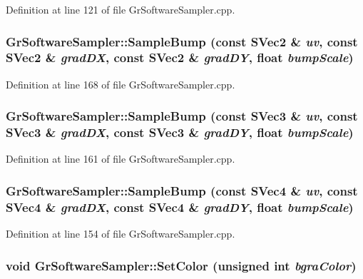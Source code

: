 Definition at line 121 of file GrSoftwareSampler.cpp.\hypertarget{class_gr_software_sampler_12d44d76b68457f8edf5d1f083c56b95}{
\subsubsection[{SampleBump}]{ GrSoftwareSampler::SampleBump (const {\bf SVec2} \& {\em uv}, \/  const {\bf SVec2} \& {\em gradDX}, \/  const {\bf SVec2} \& {\em gradDY}, \/  float {\em bumpScale})}}
\label{class_gr_software_sampler_12d44d76b68457f8edf5d1f083c56b95}




Definition at line 168 of file GrSoftwareSampler.cpp.\hypertarget{class_gr_software_sampler_ccd93c10412604a42a69071e71b3aa9a}{
\subsubsection[{SampleBump}]{ GrSoftwareSampler::SampleBump (const {\bf SVec3} \& {\em uv}, \/  const {\bf SVec3} \& {\em gradDX}, \/  const {\bf SVec3} \& {\em gradDY}, \/  float {\em bumpScale})}}
\label{class_gr_software_sampler_ccd93c10412604a42a69071e71b3aa9a}




Definition at line 161 of file GrSoftwareSampler.cpp.\hypertarget{class_gr_software_sampler_8a834ba57bb395a6cf3d9de68fba7bd0}{
\subsubsection[{SampleBump}]{ GrSoftwareSampler::SampleBump (const {\bf SVec4} \& {\em uv}, \/  const {\bf SVec4} \& {\em gradDX}, \/  const {\bf SVec4} \& {\em gradDY}, \/  float {\em bumpScale})}}
\label{class_gr_software_sampler_8a834ba57bb395a6cf3d9de68fba7bd0}




Definition at line 154 of file GrSoftwareSampler.cpp.\hypertarget{class_gr_software_sampler_445c6e3b1fdec258a9bc6f5ff2bc5750}{
\subsubsection[{SetColor}]{\setlength{\rightskip}{0pt plus 5cm}void GrSoftwareSampler::SetColor (unsigned int {\em bgraColor})}}
\label{class_gr_software_sampler_445c6e3b1fdec258a9bc6f5ff2bc5750}




